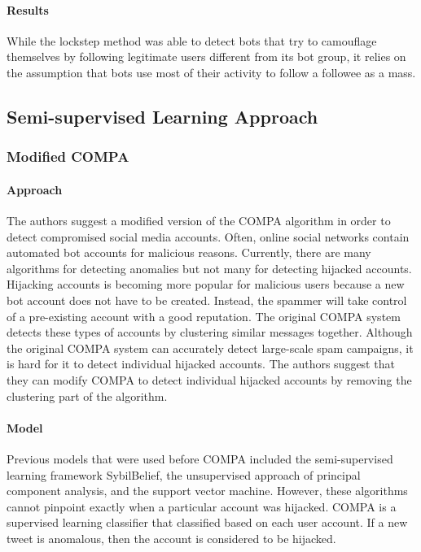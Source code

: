 \documentclass[11pt, oneside]{article}   	%
\begin{document}
\paragraph{Results}
\quad

\quad While the lockstep method was able to detect bots that try to camouflage themselves by following legitimate users different from its bot group, it relies on the assumption that bots use most of their activity to follow a followee as a mass.

\subsection{Semi-supervised Learning Approach}
\subsubsection{Modified COMPA }

\paragraph*{Approach}
\quad

\quad The authors suggest a modified version of the COMPA algorithm in order to detect compromised social media accounts.
Often, online social networks contain automated bot accounts for malicious reasons.
Currently, there are many algorithms for detecting anomalies but not many for detecting hijacked accounts.
Hijacking accounts is becoming more popular for malicious users because a new bot account does not have to be created.
Instead, the spammer will take control of a pre-existing account with a good reputation.
The original COMPA system detects these types of accounts by clustering similar messages together.
Although the original COMPA system can accurately detect large-scale spam campaigns, it is hard for it to detect individual hijacked accounts.
The authors suggest that they can modify COMPA to detect individual hijacked accounts by removing the clustering part of the algorithm.

\paragraph{Model}
\quad

\quad Previous models that were used before COMPA included the semi-supervised learning framework SybilBelief, the unsupervised approach of principal component analysis, and the support vector machine.
However, these algorithms cannot pinpoint exactly when a particular account was hijacked.
COMPA is a supervised learning classifier that classified based on each user account.
If a new tweet is anomalous, then the account is considered to be hijacked.
\end{document}
